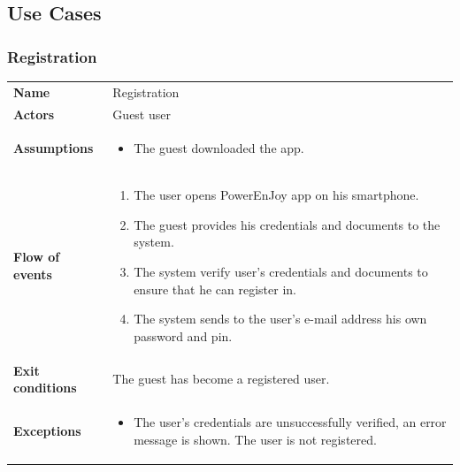 \documentclass[english]{article}
\begin{document}
	\subsection{Use Cases}
		\subsubsection{Registration}
		\begin{center}
		\begin{tabular}{l||p{10cm}}
		\textbf{Name} 
			& Registration\\ [8px]
		\textbf{Actors} 
			& Guest user\\ [8px]
		\textbf{Assumptions} 
			& \begin{itemize}
				\item The guest downloaded the app.
			\end{itemize}\\
		\textbf{Flow of events}
			& \begin{enumerate}
	 			\item The user opens PowerEnJoy app on his smartphone.
				\item The guest provides his credentials and documents to the system.
				\item The system verify user's credentials and documents to ensure that he can register in.
				\item The system sends to the user's e-mail address his own password and pin.
			\end{enumerate}\\ 
		\textbf{Exit conditions}
			& The guest has become a registered user.\\ [8px]
		\textbf{Exceptions}
			& \begin{itemize}
				\item The user's credentials are unsuccessfully verified, an error message is shown. The user is not registered.
			\end{itemize}
		\end{tabular}
		\end{center}
	
		\noindent
\end{document}
